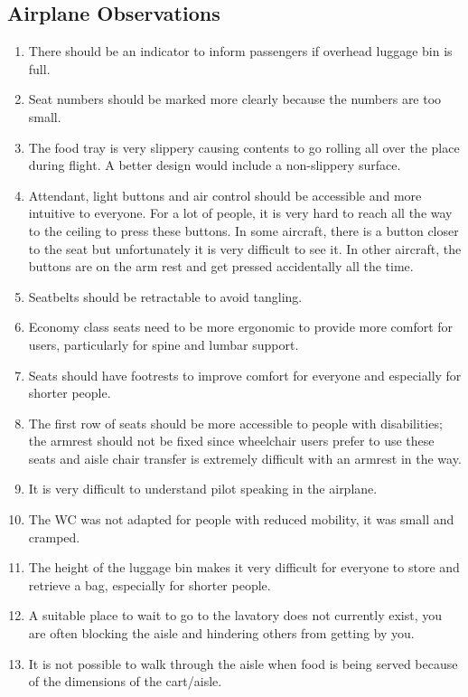 \documentclass[a4paper, 12pt,conference]{new_cit_thesis}
\begin{document}
\subsection{Airplane Observations}
\begin{enumerate}
  \item There should be an indicator to inform passengers if overhead luggage bin is full.
  \item Seat numbers should be marked more clearly because the numbers are too small.
  \item The food tray is very slippery causing contents to go rolling all over the place during flight. A better design would include a non-slippery surface.
  \item Attendant, light buttons and air control should be accessible and more intuitive to everyone. For a lot of people, it is very hard to reach all the way to the ceiling to press these buttons. In some aircraft, there is a button closer to the seat but unfortunately it is very difficult to see it. In other aircraft, the buttons are on the arm rest and get pressed accidentally all the time. 
  \item Seatbelts should be retractable to avoid tangling.
  \item Economy class seats need to be more ergonomic to provide more comfort for users, particularly for spine and lumbar support.
  \item Seats should have footrests to improve comfort for everyone and especially for shorter people. 
  \item The first row of seats should be more accessible to people with disabilities; the armrest should not be fixed since wheelchair users prefer to use these seats and aisle chair transfer is extremely difficult with an armrest in the way. 
  \item It is very difficult to understand pilot speaking in the airplane.
  \item The WC was not adapted for people with reduced mobility, it was small and cramped. 
  \item The height of the luggage bin makes it very difficult for everyone to store and retrieve a bag, especially for shorter people.
  \item  A suitable place to wait to go to the lavatory does not currently exist,  you are often blocking the aisle and hindering others from getting by you. 
  \item It is not possible to walk through the aisle when food is being served because of the dimensions of the cart/aisle.

\end{enumerate}
\end{document}
